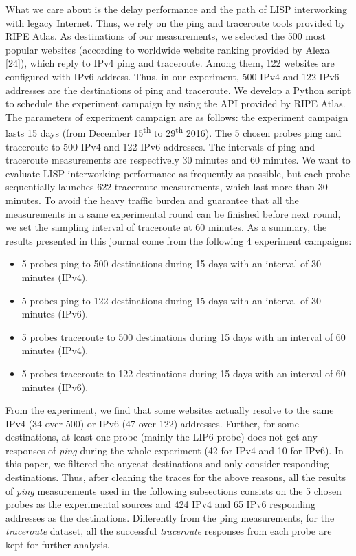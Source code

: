 What we care about is the delay performance and the path of LISP interworking with legacy Internet. Thus, we rely on the ping and traceroute tools provided by RIPE Atlas. As destinations of our measurements, we selected the 500 most popular websites (according to worldwide website ranking provided by Alexa [24]), which reply to IPv4 ping and traceroute. Among them, 122 websites are configured with IPv6 address. Thus, in our experiment, 500 IPv4 and 122 IPv6 addresses are the destinations of ping and traceroute. We develop a Python script to schedule the experiment campaign by using the API provided by RIPE Atlas. The parameters of experiment campaign are as follows: the experiment campaign lasts 15 days (from December 15\textsuperscript{th} to 29\textsuperscript{th} 2016). The 5 chosen probes ping and traceroute to 500 IPv4 and 122 IPv6 addresses. The intervals of ping and traceroute measurements are respectively 30 minutes and 60 minutes. We want to evaluate LISP interworking performance as frequently as possible, but each probe sequentially launches 622 traceroute measurements, which last more than 30 minutes. To avoid the heavy traffic burden and guarantee that all the measurements in a same experimental round can be finished before next round, we set the sampling interval of traceroute at 60 minutes. As a summary, the results presented in this journal come from the following 4 experiment campaigns:
\begin{itemize}[noitemsep,topsep=0pt]
	\item 5 probes ping to 500 destinations during 15 days with an interval of 30 minutes (IPv4).
	\item 5 probes ping to 122 destinations during 15 days with an interval of 30 minutes (IPv6).
	\item 5 probes traceroute to 500 destinations during 15 days with an interval of 60 minutes (IPv4).
	\item 5 probes traceroute to 122 destinations during 15 days with an interval of 60 minutes (IPv6).
\end{itemize}

From the experiment, we find that some websites actually resolve to the same IPv4 (34 over 500) or IPv6 (47 over 122) addresses. Further, for some destinations, at least one probe (mainly the LIP6 probe) does not get any responses of \emph{ping} during the whole experiment (42 for IPv4 and 10 for IPv6). In this paper, we filtered the anycast destinations and only consider responding destinations. Thus, after cleaning the traces for the above reasons, all the results of \emph{ping} measurements used in the following subsections consists on the 5 chosen probes as the experimental sources and 424 IPv4 and 65 IPv6 responding addresses as the destinations. Differently from the ping measurements, for the \emph{traceroute} dataset, all the successful \emph{traceroute} responses from each probe are kept for further analysis.


